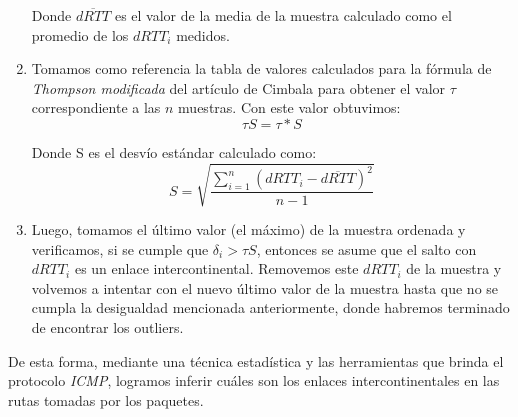\begin{enumerate}
Donde $\overline{dRTT}$ es el valor de la media de la muestra calculado como el promedio de los $dRTT_i$ medidos.

\item
Tomamos como referencia la tabla de valores calculados para la fórmula de \emph{Thompson modificada} del artículo de Cimbala para obtener el valor $\tau$ correspondiente a las $n$ muestras. Con este valor obtuvimos:
\[
\tau S = \tau * S
\]

Donde S es el desvío estándar calculado como:
\[
S=\sqrt{\frac{\sum_{i=1}^{n} (dRTT_i - \overline{dRTT})^2}{n-1}}
\]

\item
Luego, tomamos el último valor (el máximo) de la muestra ordenada y verificamos, si se cumple que $\delta_i > \tau S$, entonces se asume que el salto con $dRTT_i$ es un enlace intercontinental. Removemos este $dRTT_i$ de la muestra y volvemos a intentar con el nuevo último valor de la muestra hasta que no se cumpla la desigualdad mencionada anteriormente, donde habremos terminado de encontrar los outliers.
\end{enumerate}

De esta forma, mediante una técnica estadística y las herramientas que brinda el protocolo \emph{ICMP}, logramos inferir cuáles son los enlaces intercontinentales en las rutas tomadas por los paquetes.